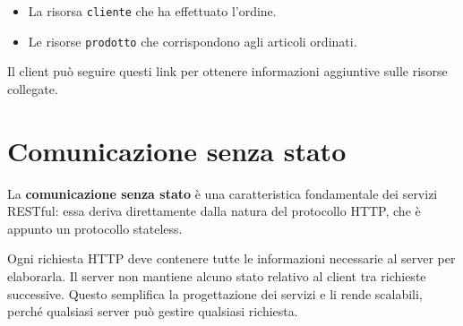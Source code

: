 \begin{itemize}
    \item La risorsa \texttt{cliente} che ha effettuato l'ordine.
    \item Le risorse \texttt{prodotto} che corrispondono agli articoli ordinati.
\end{itemize}

Il client può seguire questi link per ottenere informazioni aggiuntive sulle risorse collegate.

\section{Comunicazione senza stato}

La \textbf{comunicazione senza stato} è una caratteristica fondamentale dei servizi RESTful: essa deriva direttamente dalla natura del protocollo HTTP, che è appunto un protocollo stateless.

Ogni richiesta HTTP deve contenere tutte le informazioni necessarie al server per elaborarla. Il server non mantiene alcuno stato relativo al client tra richieste successive. Questo semplifica la progettazione dei servizi e li rende scalabili, perché qualsiasi server può gestire qualsiasi richiesta.
